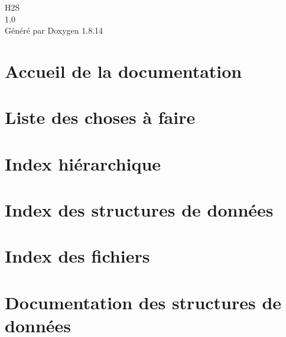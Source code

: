 \documentclass[twoside]{book}
\newcommand{\+}{\discretionary{\mbox{\scriptsize$\hookleftarrow$}}{}{}}
\newcommand{\clearemptydoublepage}{%
  \newpage{\pagestyle{empty}\cleardoublepage}%
}
\begin{document}
\hypersetup{pageanchor=false,
             bookmarksnumbered=true,
             pdfencoding=unicode
            }
\begin{titlepage}
\vspace*{7cm}
\begin{center}%
{\Large H2S \\[1ex]\large 1.\+0 }\\
\vspace*{1cm}
{\large Généré par Doxygen 1.8.14}\\
\end{center}
\end{titlepage}
\clearemptydoublepage
{}
\tableofcontents
\clearemptydoublepage
{}
\hypersetup{pageanchor=true}

\chapter{Accueil de la documentation}
\label{index}\hypertarget{index}{}
\chapter{Liste des choses à faire}
\label{todo}

\chapter{Index hiérarchique}

\chapter{Index des structures de données}

\chapter{Index des fichiers}

\chapter{Documentation des structures de données}









\end{document}
